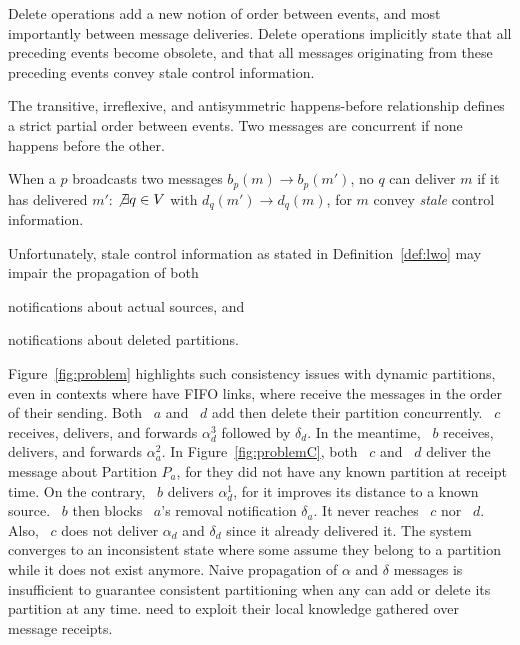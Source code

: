 Delete operations add a new notion of order between events, and most
importantly between message deliveries. Delete operations implicitly
state that all preceding events become obsolete, and that all messages
originating from these preceding events convey stale control
information.

\begin{definition}
  The transitive, irreflexive, and antisymmetric happens-before
  relationship defines a strict partial order between events. Two
  messages are concurrent if none happens before the other.
\end{definition}

\begin{definition}
  When a \process $p$ broadcasts two messages $b_p(m) \rightarrow
  b_p(m')$, no \process $q$ can deliver $m$ if it has delivered $m'$:
  $\not\exists q \in V$ with $d_q(m') \rightarrow d_q(m)$, for $m$
  convey \emph{stale} control information.
\end{definition}






Unfortunately, stale control information as stated in
Definition~\ref{def:lwo} may impair the propagation of both
\begin{inparaenum}[(i)]
\item notifications about actual sources, and
\item notifications about deleted partitions.
\end{inparaenum}
Figure~\ref{fig:problem} highlights such consistency issues with
dynamic partitions, even in contexts where \processes have FIFO links,
\ie where \processes receive the messages in the order of their
sending. Both \Process~$a$ and \Process~$d$ add then delete their
partition concurrently. \Process~$c$ receives, delivers, and forwards
$\alpha_d^3$ followed by $\delta_d$. In the meantime, \Process~$b$
receives, delivers, and forwards $\alpha_a^2$. In
Figure~\ref{fig:problemC}, both \Process~$c$ and \Process~$d$ deliver
the message about Partition $P_a$, for they did not have any known
partition at receipt time. On the contrary, \Process~$b$ delivers
$\alpha_d^1$, for it improves its distance to a known
source. \Process~$b$ then blocks \Process~$a$'s removal notification
$\delta_a$. It never reaches \Process~$c$ nor \Process~$d$. Also,
\Process~$c$ does not deliver $\alpha_d$ and $\delta_d$ since it
already delivered it. The system converges to an inconsistent state
where some \processes assume they belong to a partition while it does
not exist anymore. Naive propagation of $\alpha$ and $\delta$ messages
is insufficient to guarantee consistent partitioning when any \process
can add or delete its partition at any time. \Processes need to
exploit their local knowledge gathered over message receipts.


